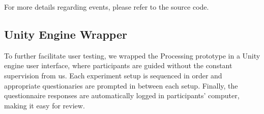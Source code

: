For more details regarding events, please refer to the source code.

\subsection{Unity Engine Wrapper}

To further facilitate user testing, we wrapped the Processing prototype in a Unity engine user interface, where participants are guided without the constant supervision from us. Each experiment setup is sequenced in order and appropriate questionaries are prompted in between each setup. Finally, the questionnaire responses are automatically logged in participants’ computer, making it easy for review.

